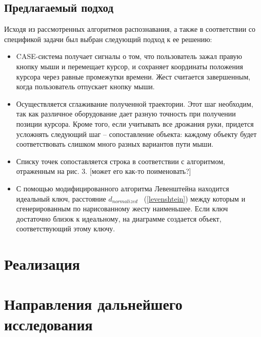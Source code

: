 \documentclass[a5paper]{article}
\begin{document}
\subsection{Предлагаемый подход}

Исходя из рассмотренных алгоритмов распознавания, а также в соответствии со спецификой задачи был выбран следующий подход к ее решению:

\begin{itemize}
  \item CASE-система получает сигналы о том, что пользователь зажал правую кнопку мыши и перемещает курсор, и сохраняет координаты положения курсора
через равные промежутки времени. Жест считается завершенным, когда пользователь отпускает кнопку мыши.
  \item Осуществляется сглаживание полученной траектории. Этот шаг необходим, так как различное оборудование дает разную точность при получении 
позиции курсора. Кроме того, если учитывать все дрожания руки, придется усложнять следующий шаг -- сопоставление объекта: каждому объекту
будет соответствовать слишком много разных вариантов пути мыши.
  \item Списку точек сопоставляется строка в соответствии с алгоритмом, отраженным на рис. 3. [может его как-то поименовать?]
  \item С помощью модифицированного алгоритма Левенштейна находится идеальный ключ, расстояние $d_{normalized}$ ~(\ref{levenshtein}) между которым и 
сгенерированным по нарисованному жесту наименьшее. Если ключ достаточно близок к идеальному, на диаграмме создается объект, соответствующий этому ключу.
\end{itemize}


\section{Реализация}

\section{Направления дальнейшего исследования}
\end{document}

